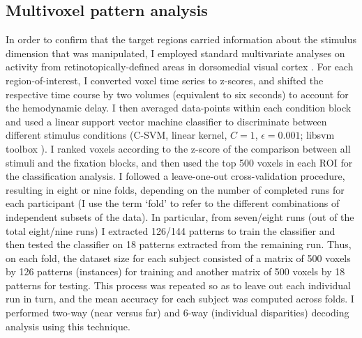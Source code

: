 \subsection{Multivoxel pattern analysis}
In order to confirm that the target regions carried information about the stimulus dimension that was manipulated, I employed standard multivariate analyses on activity from retinotopically-defined areas in dorsomedial visual cortex \cite{Preston:2008dg}. For each region-of-interest, I converted voxel time series to z-scores, and shifted the respective time course by two volumes (equivalent to six seconds) to account for the hemodynamic delay. I then averaged data-points within each condition block and used a linear support vector machine classifier to discriminate between different stimulus conditions (C-SVM, linear kernel, $C=1$, $\epsilon=0.001$; libsvm toolbox \cite{Chang:2011:LLS:1961189.1961199}). I ranked voxels according to the z-score of the comparison between all stimuli and the fixation blocks, and then used the top 500 voxels in each ROI for the classification analysis. I followed a leave-one-out cross-validation procedure, resulting in eight or nine folds, depending on the number of completed runs for each participant (I use the term `fold' to refer to the different combinations of independent subsets of the data). In particular, from seven/eight runs (out of the total eight/nine runs) I extracted 126/144 patterns to train the classifier and then tested the classifier on 18 patterns extracted from the remaining run. Thus, on each fold, the dataset size for each subject consisted of a matrix of 500 voxels by 126 patterns (instances) for training and another matrix of 500 voxels by 18 patterns for testing. This process was repeated so as to leave out each individual run in turn, and the mean accuracy for each subject was computed across folds. I performed two-way (near versus far) and 6-way (individual disparities) decoding analysis using this technique.

